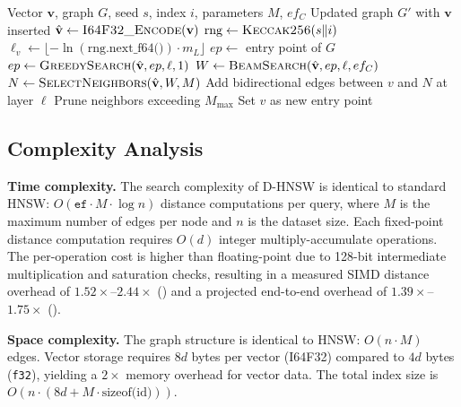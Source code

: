 \documentclass[10pt,journal]{IEEEtran}
\newcommand{\dhnsw}{\textsc{D-HNSW}}
\newcommand{\hnsw}{\textsc{HNSW}}
\begin{document}
\begin{algorithm}[t]
  \caption{\dhnsw{} Deterministic Insert}
  \label{alg:dhnsw_insert}
  \begin{algorithmic}[1]
    \REQUIRE Vector $\mathbf{v}$, graph $G$, seed $s$, index $i$, parameters $M$, $ef_C$
    \ENSURE Updated graph $G'$ with $\mathbf{v}$ inserted
    \STATE $\hat{\mathbf{v}} \leftarrow \textsc{I64F32\_Encode}(\mathbf{v})$
    \STATE $\text{rng} \leftarrow \textsc{Keccak256}(s \| i)$
    \STATE $\ell_v \leftarrow \lfloor -\ln(\text{rng.next\_f64()}) \cdot m_L \rfloor$
    \STATE $ep \leftarrow$ entry point of $G$
      \STATE $ep \leftarrow \textsc{GreedySearch}(\hat{\mathbf{v}}, ep, \ell, 1)$
    \ENDFOR
      \STATE $W \leftarrow \textsc{BeamSearch}(\hat{\mathbf{v}}, ep, \ell, ef_C)$
      \STATE $N \leftarrow \textsc{SelectNeighbors}(\hat{\mathbf{v}}, W, M)$
      \STATE Add bidirectional edges between $v$ and $N$ at layer $\ell$
      \STATE Prune neighbors exceeding $M_{\max}$
    \ENDFOR
      \STATE Set $v$ as new entry point
    \ENDIF
  \end{algorithmic}
\end{algorithm}


\subsection{Complexity Analysis}

\textbf{Time complexity.} The search complexity of \dhnsw{} is identical to standard \hnsw{}: $O(\texttt{ef} \cdot M \cdot \log n)$ distance computations per query, where $M$ is the maximum number of edges per node and $n$ is the dataset size. Each fixed-point distance computation requires $O(d)$ integer multiply-accumulate operations. The per-operation cost is higher than floating-point due to 128-bit intermediate multiplication and saturation checks, resulting in a measured SIMD distance overhead of $1.52\times$--$2.44\times$ () and a projected end-to-end overhead of $1.39\times$--$1.75\times$ ().

\textbf{Space complexity.} The graph structure is identical to \hnsw{}: $O(n \cdot M)$ edges. Vector storage requires $8d$ bytes per vector (I64F32) compared to $4d$ bytes (\texttt{f32}), yielding a $2\times$ memory overhead for vector data. The total index size is $O(n \cdot (8d + M \cdot \text{sizeof(id)}))$.
\end{document}
